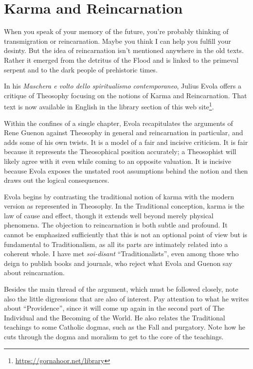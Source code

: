 \section{Karma and Reincarnation}

\begin{quotex}
When you speak of your memory of the future, you're probably thinking of transmigration or reincarnation. Maybe you think I can help you fulfill your desinty. But the idea of reincarnation isn't mentioned anywhere in the old texts. Rather it emerged from the detritus of the Flood and is linked to the primeval serpent and to the dark people of prehistoric times.
\end{quotex}


In his \emph{Maschera e volto dello spiritualismo contemporaneo}, Julius Evola offers a critique of Theosophy focusing on the notions of Karma and Reincarnation. That text is now available in English in the library section of this web site\footnote{\url{https://gornahoor.net/library}}.

Within the confines of a single chapter, Evola recapitulates the arguments of Rene Guenon against Theosophy in general and reincarnation in particular, and adds some of his own twists. It is a model of a fair and incisive criticism. It is fair because it represents the Theosophical position accurately; a Theosophist will likely agree with it even while coming to an opposite valuation. It is incisive because Evola exposes the unstated root assumptions behind the notion and then draws out the logical consequences.

Evola begins by contrasting the traditional notion of karma with the modern version as represented in Theosophy. In the Traditional conception, karma is the law of cause and effect, though it extends well beyond merely physical phenomena. The objection to reincarnation is both subtle and profound. It cannot be emphasized sufficiently that this is not an optional point of view but is fundamental to Traditionalism, as all its parts are intimately related into a coherent whole. I have met \emph{soi-disant} ``Traditionalists'', even among those who deign to publish books and journals, who reject what Evola and Guenon say about reincarnation.

Besides the main thread of the argument, which must be followed closely, note also the little digressions that are also of interest. Pay attention to what he writes about ``Providence'', since it will come up again in the second part of The Individual and the Becoming of the World. He also relates the Traditional teachings to some Catholic dogmas, such as the Fall and purgatory. Note how he cuts through the dogma and moralism to get to the core of the teachings.


